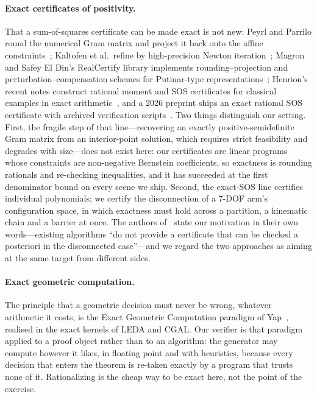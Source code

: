 \documentclass[10pt,twocolumn,letterpaper]{article}
\newcommand{\vone}[1]{#1}  %
\begin{document}
\paragraph{Exact certificates of positivity.} That a sum-of-squares certificate can be made exact is not new: Peyrl and Parrilo round the numerical Gram matrix and project it back onto the affine constraints~\cite{peyrl2008}; Kaltofen et al.\ refine by high-precision Newton iteration~\cite{kaltofen2008}; Magron and Safey El Din's RealCertify library implements rounding--projection and perturbation--compensation schemes for Putinar-type representations~\cite{magron2018realcertify,magron2018putinar,magron2021jsc}; Henrion's recent notes construct rational moment and SOS certificates for classical examples in exact arithmetic~\cite{henrion2025notsos,henrion2025stengle}, and a 2026 preprint ships an exact rational SOS certificate with archived verification scripts~\cite{hypercube2026}. Two things distinguish our setting. First, the fragile step of that line---recovering an exactly positive-semidefinite Gram matrix from an interior-point solution, which requires strict feasibility and degrades with size---does not exist here: our certificates are linear programs whose constraints are non-negative Bernstein coefficients, so exactness is rounding rationals and re-checking inequalities, and it has succeeded at the first denominator bound on every scene we ship. Second, the exact-SOS line certifies individual polynomials; we certify the disconnection of a 7-DOF arm's configuration space, in which exactness must hold across a partition, a kinematic chain and a barrier at once. The authors of~\cite{henrion2024} state our motivation in their own words---existing algorithms ``do not provide a certificate that can be checked a posteriori in the disconnected case''---and we regard the two approaches as aiming at the same target from different sides.

\paragraph{Exact geometric computation.} \vone{The principle that a geometric decision must never be wrong, whatever arithmetic it costs, is the Exact Geometric Computation paradigm of Yap~\cite{yap1997,yapdube1995}, realised in the exact kernels of LEDA and CGAL. Our verifier is that paradigm applied to a proof object rather than to an algorithm: the generator may compute however it likes, in floating point and with heuristics, because every decision that enters the theorem is re-taken exactly by a program that trusts none of it. Rationalizing is the cheap way to be exact here, not the point of the exercise.}
\end{document}
